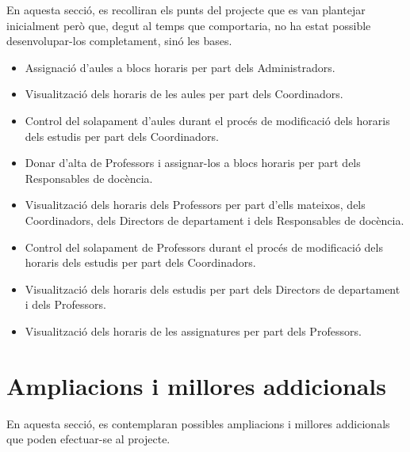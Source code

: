 \documentclass[a4paper,12pt]{ThesisStyle}
\begin{document}
En aquesta secció, es recolliran els punts del projecte que es van plantejar inicialment però que, degut al temps que comportaria, no ha estat possible desenvolupar-los completament, sinó les bases.

\begin{itemize}
  \item Assignació d'aules a blocs horaris per part dels Administradors.
  \item Visualització dels horaris de les aules per part dels Coordinadors.
  \item Control del solapament d'aules durant el procés de modificació dels horaris dels estudis per part dels Coordinadors.
  \item Donar d'alta de Professors i assignar-los a blocs horaris per part dels Responsables de docència.
  \item Visualització dels horaris dels Professors per part d'ells mateixos, dels Coordinadors, dels Directors de departament i dels Responsables de docència.
  \item Control del solapament de Professors durant el procés de modificació dels horaris dels estudis per part dels Coordinadors.
  \item Visualització dels horaris dels estudis per part dels Directors de departament i dels Professors.
  \item Visualització dels horaris de les assignatures per part dels Professors.
\end{itemize}

\section{Ampliacions i millores addicionals}
\label{sec:ampliacions_addicionals}

En aquesta secció, es contemplaran possibles ampliacions i millores addicionals que poden efectuar-se al projecte.
\end{document}
